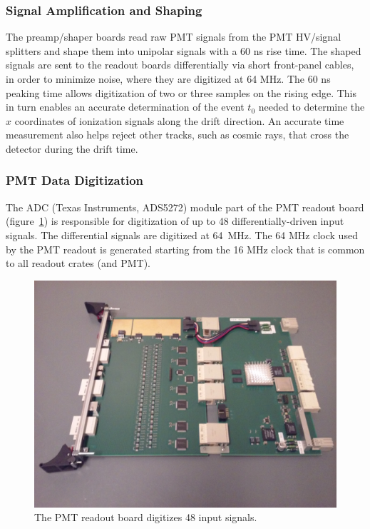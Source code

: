 \subsubsection{\label{sec:PMTamp}Signal Amplification and Shaping}

The preamp/shaper boards read raw PMT signals from the PMT HV/signal splitters and shape them into unipolar signals with a 60 ns rise time. The shaped signals are sent to the \lartpc readout boards differentially via short front-panel cables, in order to minimize noise, where they are digitized at 64 MHz. The 60 ns peaking time allows digitization of two or three samples on the rising edge. This in turn enables an accurate determination of the event $t_0$ needed to determine the $x$ coordinates of ionization signals along the drift direction. An accurate time measurement also helps reject other tracks, such as cosmic rays, that cross the detector during the drift time.

\subsubsection{PMT Data Digitization}
\label{sec:pmtdigit}

The ADC (Texas Instruments, ADS5272) module part of the PMT readout board (figure~\ref{fig:readout_8}) is responsible for digitization of up to 48 differentially-driven input signals. The differential signals are digitized at 64~MHz. The 64 MHz clock used by the PMT readout is generated starting from the 16 MHz clock that is common to all readout crates (\lartpc and PMT). 


\begin{figure}
\centering
\includegraphics[width=0.8\linewidth]{./figures/PMTshaper.jpg}%
\caption{\label{fig:readout_8}The PMT readout board digitizes 48 input signals.}
\end{figure}

